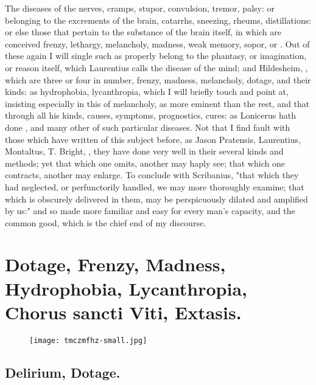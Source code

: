 The diseases of the nerves, cramps, stupor, convulsion, tremor, palsy: or
belonging to the excrements of the brain, catarrhs, sneezing, rheums,
distillations: or else those that pertain to the substance of the brain itself,
in which are conceived frenzy, lethargy, melancholy, madness, weak memory,
sopor, or . Out of these again I will single
such as properly belong to the phantasy, or imagination, or reason itself,
which Laurentius calls the disease of the mind; and
Hildesheim, , which are three or four in number, frenzy,
madness, melancholy, dotage, and their kinds: as hydrophobia, lycanthropia,
 which I will briefly touch and point at, insisting especially in this
of melancholy, as more eminent than the rest, and that through all his kinds,
causes, symptoms, prognostics, cures: as Lonicerus hath done
, and many other of such particular
diseases. Not that I find fault with those which have written of this subject
before, as Jason Pratensis, Laurentius, Montaltus, T. Bright, \etc{}, they have
done very well in their several kinds and methods; yet that which one omits,
another may haply see; that which one contracts, another may enlarge. To
conclude with Scribanius, "that which they had neglected,
or perfunctorily handled, we may more thoroughly examine; that which is
obscurely delivered in them, may be perspicuously dilated and amplified by us:"
and so made more familiar and easy for every man's capacity, and the common
good, which is the chief end of my discourse.

\section[Madness]{Dotage, Frenzy, Madness, Hydrophobia, Lycanthropia, Chorus sancti Viti, Extasis.}
\begin{figure}[H]
  \begingroup
  \centering
  \texttt{[image: tmczmfhz-small.jpg]}
  \label{fig:madness}
\end{figure}

\subsection{Delirium, Dotage.}

